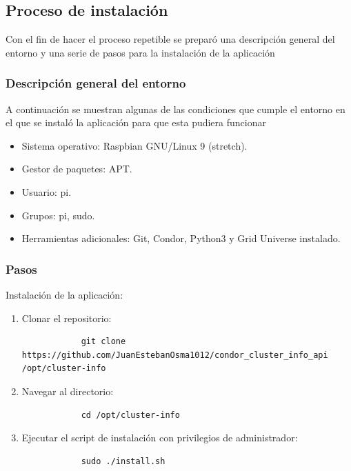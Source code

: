 \subsection{Proceso de instalación}
\noindent

Con el fin de hacer el proceso repetible se preparó una descripción general del entorno y una serie de pasos para la instalación de la aplicación

\subsubsection{Descripción general del entorno}
\noindent
A continuación se muestran algunas de las condiciones que cumple el entorno en el que se instaló la aplicación para que esta pudiera funcionar

\begin{itemize}
	\item Sistema operativo: Raspbian GNU/Linux 9 (stretch).
	\item Gestor de paquetes: APT.
	\item Usuario: pi.
	\item Grupos: pi, sudo.
	\item Herramientas adicionales: Git, Condor, Python3 y Grid Universe instalado.
\end{itemize}

\subsubsection{Pasos}
\noindent

Instalación de la aplicación:

\begin{enumerate}
	\item Clonar el repositorio:
	      \begin{verbatim}
			git clone https://github.com/JuanEstebanOsma1012/condor_cluster_info_api /opt/cluster-info
		\end{verbatim}
	
	\item Navegar al directorio:
	      \begin{verbatim}
			cd /opt/cluster-info
		\end{verbatim}
	
	\item Ejecutar el script de instalación con privilegios de administrador:
	      \begin{verbatim}
			sudo ./install.sh
		\end{verbatim}
\end{enumerate}


